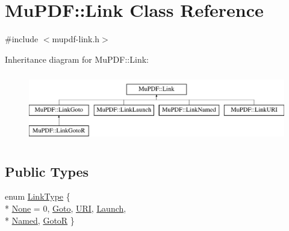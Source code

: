 \hypertarget{class_mu_p_d_f_1_1_link}{\section{Mu\-P\-D\-F\-:\-:Link Class Reference}
\label{class_mu_p_d_f_1_1_link}
}


{\ttfamily \#include $<$mupdf-\/link.\-h$>$}

Inheritance diagram for Mu\-P\-D\-F\-:\-:Link\-:\begin{figure}[H]
\begin{center}
\leavevmode
\includegraphics[height=3.000000cm]{class_mu_p_d_f_1_1_link}
\end{center}
\end{figure}
\subsection*{Public Types}
\begin{DoxyCompactItemize}
\item 
enum \hyperlink{class_mu_p_d_f_1_1_link_afdc6828b6e00f323b53d6ae36d0d06b6}{Link\-Type} \{ \\*
\hyperlink{class_mu_p_d_f_1_1_link_afdc6828b6e00f323b53d6ae36d0d06b6a60f06bd9a99b996b6f05f15076814c8e}{None} = 0, 
\hyperlink{class_mu_p_d_f_1_1_link_afdc6828b6e00f323b53d6ae36d0d06b6a8e8dbec5daeb07d386fe261d877639fb}{Goto}, 
\hyperlink{class_mu_p_d_f_1_1_link_afdc6828b6e00f323b53d6ae36d0d06b6af19bc40abcfe48b5816df0cb96ee025f}{U\-R\-I}, 
\hyperlink{class_mu_p_d_f_1_1_link_afdc6828b6e00f323b53d6ae36d0d06b6a2d292d251eaa8666035d5648a24522c8}{Launch}, 
\\*
\hyperlink{class_mu_p_d_f_1_1_link_afdc6828b6e00f323b53d6ae36d0d06b6a64bad01bb17f65698146da642da33983}{Named}, 
\hyperlink{class_mu_p_d_f_1_1_link_afdc6828b6e00f323b53d6ae36d0d06b6a53227a954ff1d67fe8669a282ae68f63}{Goto\-R}
 \}
\end{DoxyCompactItemize}
